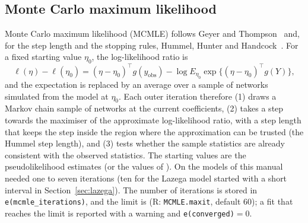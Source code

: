 \subsection{Monte Carlo maximum likelihood}\label{sec:mcmle}

Monte Carlo maximum likelihood (MCMLE) follows Geyer and Thompson~\cite{geyer1992} and, for the step length and the stopping rules, Hummel, Hunter and Handcock~\cite{hummel2012}. For a fixed starting value $\eta_0$, the log-likelihood ratio is
\[
  \ell(\eta)-\ell(\eta_0)=(\eta-\eta_0)^{\top}g(y_{\mathrm{obs}})-\log E_{\eta_0}\exp\{(\eta-\eta_0)^{\top}g(Y)\},
\]
and the expectation is replaced by an average over a sample of networks simulated from the model at $\eta_0$. Each outer iteration therefore (1) draws a Markov chain sample of networks at the current coefficients, (2) takes a step towards the maximiser of the approximate log-likelihood ratio, with a step length that keeps the step inside the region where the approximation can be trusted (the Hummel step length), and (3) tests whether the sample statistics are already consistent with the observed statistics. The starting values are the pseudolikelihood estimates (or the values of ). On the models of this manual \nwergm{} needed one to seven iterations (ten for the Lazega model started with a short interval in Section~\ref{sec:lazega}). The number of iterations is stored in \texttt{e(mcmle\_iterations)}, and the limit is  (R: \texttt{MCMLE.maxit}, default 60); a fit that reaches the limit is reported with a warning and \texttt{e(converged)}${}=0$.

